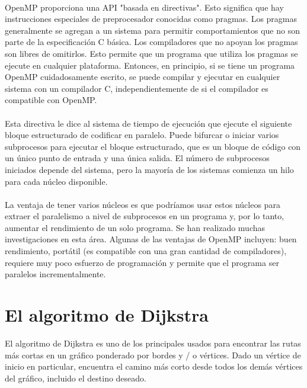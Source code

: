 \documentclass[11pt]{article}
\begin{document}
\paragraph{}
OpenMP proporciona una API "basada en directivas". Esto significa que hay instrucciones especiales de preprocesador conocidas como pragmas. Los pragmas generalmente se agregan a un sistema para permitir comportamientos que no son parte de la especificación C básica. Los compiladores que no apoyan los pragmas son libres de omitirlos. Esto permite que un programa que utiliza los pragmas se ejecute en cualquier plataforma. Entonces, en principio, si se tiene un programa OpenMP cuidadosamente escrito, se puede compilar y ejecutar en cualquier sistema con un compilador C, independientemente de si el compilador es compatible con OpenMP.

\paragraph{}
Esta directiva le dice al sistema de tiempo de ejecución que ejecute el siguiente bloque estructurado de codificar en paralelo. Puede bifurcar o iniciar varios subprocesos para ejecutar el bloque estructurado, que es un bloque de código con un único punto de entrada y una única salida. El número de subprocesos iniciados depende del sistema, pero la mayoría de los sistemas
comienza un hilo para cada núcleo disponible.

\paragraph{}
La ventaja de tener varios núcleos es que podríamos usar estos núcleos para extraer el paralelismo a nivel de subprocesos en un programa y, por lo tanto, aumentar el rendimiento de un solo programa. Se han realizado muchas investigaciones en esta área. Algunas de las ventajas de OpenMP incluyen: buen rendimiento, portátil (es compatible con una gran cantidad de compiladores), requiere muy poco esfuerzo de programación y permite que el programa ser paralelos incrementalmente.

\section{El algoritmo de Dijkstra}
El algoritmo de Dijkstra es uno de los principales usados para encontrar las rutas más cortas en un gráfico ponderado por bordes y / o vértices. Dado un vértice de inicio en particular, encuentra el camino más corto desde todos los demás vértices del gráfico, incluido el destino deseado. 
\end{document}
